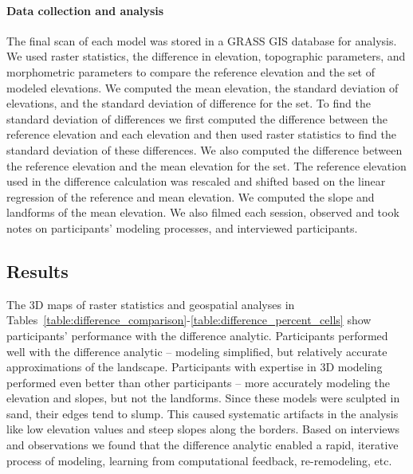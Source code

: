 \documentclass[Afour,sageh,times]{sagej}
\begin{document}
\paragraph{Data collection and analysis}
The final scan of each model was stored in a 
GRASS GIS database for analysis. 
We used raster statistics, the difference in elevation, 
topographic parameters, and morphometric parameters
to compare the reference elevation 
and the set of modeled elevations. 
We computed 
the mean elevation,
the standard deviation of elevations, 
and the standard deviation of difference for the set.
To find the standard deviation of differences 
we first computed the difference 
between the reference elevation and each elevation 
and then used raster statistics 
to find the standard deviation of these differences.
We also computed the difference between the 
reference elevation and the mean elevation for the set. 
The reference elevation used in the difference calculation 
was rescaled and shifted based on the 
linear regression of the reference and mean elevation.
We computed the slope and landforms of the mean elevation. 
We also filmed each session, 
observed and took notes on participants' modeling processes, 
and interviewed participants.

\subsection{Results}
The 3D maps of raster statistics and geospatial analyses in
Tables~\ref{table:difference_comparison}-\ref{table:difference_percent_cells} 
show participants' performance with the difference analytic.
Participants performed well with the difference analytic 
-- modeling simplified, 
but relatively accurate approximations of the landscape.
Participants with expertise in 3D modeling 
performed even better than other participants 
-- more accurately modeling the elevation and slopes,
but not the landforms. 
Since these models were sculpted in sand,
their edges tend to slump.
This caused systematic artifacts in the analysis like
low elevation values and steep slopes
along the borders. 
Based on interviews and observations
we found that the difference analytic enabled
a rapid, iterative process 
of modeling, learning from computational feedback, 
re-remodeling, etc.
\end{document}
